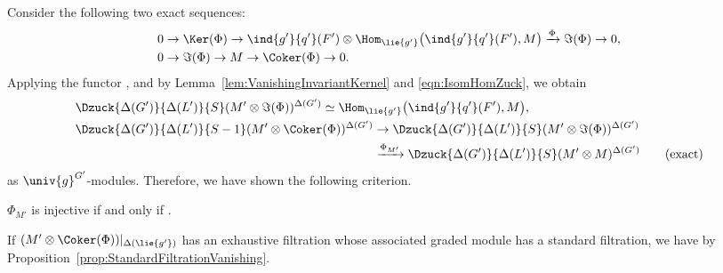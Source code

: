 Consider the following two exact sequences:
\begin{align*}
	&0 \rightarrow \Ker(\Phi)\rightarrow \ind{g'}{q'}(F') \otimes \Hom_{\lie{g'}}\bigl(\ind{g'}{q'}(F'), M\bigr) \xrightarrow{\Phi} \Im(\Phi) \rightarrow 0, \\
	&0 \rightarrow \Im(\Phi)\rightarrow M \rightarrow \Coker(\Phi) \rightarrow 0.
\end{align*}
Applying the functor , and by Lemma~\ref{lem:VanishingInvariantKernel} and \eqref{eqn:IsomHomZuck}, we obtain
\begin{align*}
	&\Dzuck{\Delta(G')}{\Delta(L')}{S}(M'\otimes \Im(\Phi))^{\Delta(G')}\simeq \Hom_{\lie{g'}}\bigl(\ind{g'}{q'}(F'), M\bigr), \\
	&\Dzuck{\Delta(G')}{\Delta(L')}{S - 1}(M'\otimes \Coker(\Phi))^{\Delta(G')}
 \rightarrow \Dzuck{\Delta(G')}{\Delta(L')}{S}(M'\otimes \Im(\Phi))^{\Delta(G')} \\
	&\hphantom{\Dzuck{\Delta(G')}{\Delta(L')}{S - 1}(M'\otimes \Coker(\Phi))^{\Delta(G')}}{}
 \xrightarrow{\Phi_{M'}} \Dzuck{\Delta(G')}{\Delta(L')}{S}(M'\otimes M)^{\Delta(G')} \qquad (\text{exact})
\end{align*}
as $\univ{g}^{G'}$-modules.
Therefore, we have shown the following criterion.

\begin{Theorem}\label{thm:InjectivePhi}
	$\Phi_{M'}$ is injective if and only if .
\end{Theorem}

\begin{Remark}\label{rmk:InjectivePhiStandard}
	If $(M'\otimes \Coker(\Phi))|_{\Delta(\lie{g'})}$ has an exhaustive filtration whose associated graded module has a standard filtration, we have  by Proposition~\ref{prop:StandardFiltrationVanishing}.
\end{Remark}

